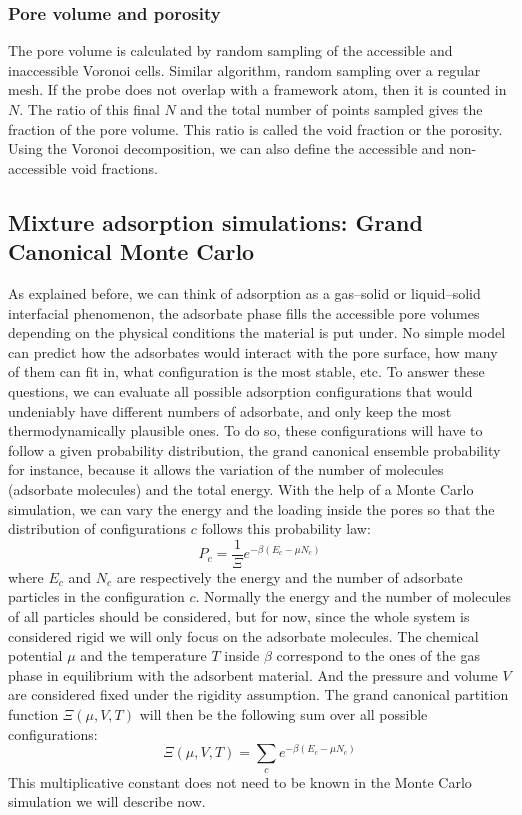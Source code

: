 \documentclass[main.tex]{subfiles}
\begin{document}
\subsubsection{Pore volume and porosity}

The pore volume is calculated by random sampling of the accessible and inaccessible Voronoi cells. Similar algorithm, random sampling over a regular mesh. If the probe does not overlap with a framework atom, then it is counted in $N$. The ratio of this final $N$ and the total number of points sampled gives the fraction of the pore volume. This ratio is called the void fraction or the porosity. Using the Voronoi decomposition, we can also define the accessible and non-accessible void fractions.\todo{}

\subsection{Mixture adsorption simulations: Grand Canonical Monte Carlo}

As explained before, we can think of adsorption as a gas--solid or liquid--solid interfacial phenomenon, the adsorbate phase fills the accessible pore volumes depending on the physical conditions the material is put under. No simple model can predict how the adsorbates would interact with the pore surface, how many of them can fit in, what configuration is the most stable, etc. To answer these questions, we can evaluate all possible adsorption configurations that would undeniably have different numbers of adsorbate, and only keep the most thermodynamically plausible ones. To do so, these configurations will have to follow a given probability distribution, the grand canonical ensemble probability for instance, because it allows the variation of the number of molecules (adsorbate molecules) and the total energy. With the help of a Monte Carlo simulation, we can vary the energy and the loading inside the pores so that the distribution of configurations $c$ follows this probability law: 
\begin{equation}
  P_c = \dfrac{1}{\Xi}e^{-\beta\left(E_c-\mu N_c\right)} 
  \label{eqn:gc}
\end{equation}
where $E_c$ and $N_c$ are respectively the energy and the number of adsorbate particles in the configuration $c$. Normally the energy and the number of molecules of all particles should be considered, but for now, since the whole system is considered rigid we will only focus on the adsorbate molecules. The chemical potential $\mu$ and the temperature $T$ inside $\beta$ correspond to the ones of the gas phase in equilibrium with the adsorbent material. And the pressure and volume $V$ are considered fixed under the rigidity assumption. The grand canonical partition function $\Xi(\mu,V,T)$ will then be the following sum over all possible configurations: 
\begin{equation}
  \Xi(\mu,V,T) = \sum_c e^{-\beta\left(E_c-\mu N_c\right)} 
\end{equation}
This multiplicative constant does not need to be known in the Monte Carlo simulation we will describe now. 
\end{document}
